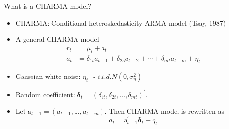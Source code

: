 \documentclass[presentation,10pt]{beamer}
\begin{document}
\begin{frame}[label={sec:orga1f3b54}]{What is a CHARMA model?}
\begin{itemize}
\item CHARMA: Conditional heteroskedasticity ARMA model (Tsay, 1987)
\end{itemize}

\vspace{0.05cm}

\begin{itemize}
\item A general CHARMA model
\begin{align*}
r_t &= \mu_t + a_t \\
a_t &= \delta_{1t} a_{t-1} + \delta_{25} a_{t-2} + 
       \cdots + \delta_{mt} a_{t-m} + \eta_t
\end{align*}

\item Gaussian white noise: \(\eta_t \sim i.i.d. N(0, \sigma^2_{\eta})\)
\end{itemize}

\vspace{0.05cm}

\begin{itemize}
\item Random coefficient: \(\boldsymbol{\delta}_t = (\delta_{1t},
  \delta_{2t}, \ldots, \delta_{mt})^{\prime}\).
\end{itemize}

\vspace{0.05cm}

\begin{itemize}
\item Let \(\mathrm{a}_{t-1} = (a_{t-1}, \ldots, a_{t-m})\). Then CHARMA
model is rewritten as 
\[ a_t = \mathrm{a}_{t-1}^{\prime} \boldsymbol{\delta}_t + \eta_t \]
\end{itemize}
\end{frame}
\end{document}
